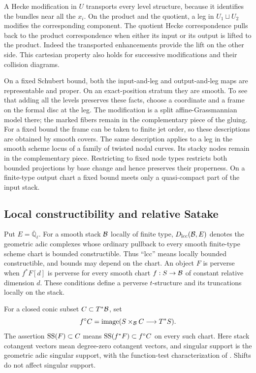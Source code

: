 A Hecke modification in $U$ transports every level structure, because
it identifies the bundles near all the $x_i$.  On the product and the
quotient, a leg in $U_1\sqcup U_2$ modifies the corresponding component.
The quotient Hecke correspondence pulls back to the product
correspondence when either its input or its output is lifted to the
product.  Indeed the transported enhancements provide the lift on the
other side.  This cartesian property also holds for successive
modifications and their collision diagrams.

On a fixed Schubert bound, both the input-and-leg and output-and-leg
maps are representable and proper.  On an exact-position stratum they
are smooth.  To see that adding all the levels preserves these facts,
choose a coordinate and a frame on the formal disc at the leg.  The
modification is a split affine-Grassmannian model there; the marked
fibers remain in the complementary piece of the gluing.  For a fixed
bound the frame can be taken to finite jet order, so these descriptions
are obtained by smooth covers.  The same description applies to a leg
in the smooth scheme locus of a family of twisted nodal curves.  Its
stacky nodes remain in the complementary piece.  Restricting to fixed
node types restricts both bounded projections by base change and hence
preserves their properness.  On a finite-type output chart a fixed
bound meets only a quasi-compact part of the input stack.

\subsection{Local constructibility and relative Satake}

Put $E=\overline{\mathbb Q}_\ell$.  For a smooth stack $\mathcal B$ locally of
finite type, $D_{\mathrm{lcc}}(\mathcal B,E)$ denotes the geometric adic complexes whose
ordinary pullback to every smooth finite-type scheme chart is bounded
constructible.  Thus ``lcc'' means locally bounded constructible, and
bounds may depend on the chart.  An object $F$ is perverse when
$f^*F[d]$ is perverse for every smooth chart $f:S\to\mathcal B$ of constant
relative dimension $d$.  These conditions define a perverse
$t$-structure and its truncations locally on the stack.

For a closed conic subset $C\subset T^*\mathcal B$, set
\[
 f^\circ C=\operatorname{image}
   (S\times_{\mathcal B}C\longrightarrow T^*S).
\]
The assertion $\operatorname{SS}(F)\subset C$ means
$\operatorname{SS}(f^*F)\subset f^\circ C$ on every such chart.  Here stack
cotangent vectors mean degree-zero cotangent vectors, and singular
support is the geometric adic singular support, with the
function-test characterization of \cite[\S1.5, Theorem~(vii)]{Barrett}.
Shifts do not affect singular support.

